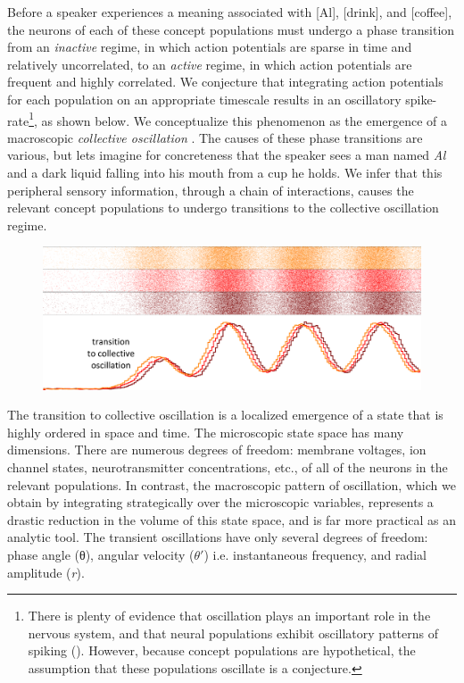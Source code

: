 Before a speaker experiences a meaning associated with [Al], [drink], and [coffee], the neurons of each of these concept populations must undergo a phase transition from an \textit{inactive} regime, in which action potentials are sparse in time and relatively uncorrelated, to an \textit{active} regime, in which action potentials are frequent and highly correlated. We conjecture that integrating action potentials for each population on an appropriate timescale results in an oscillatory spike-rate\footnote{There is plenty of evidence that oscillation plays an important role in the nervous system, and that neural populations exhibit oscillatory patterns of spiking (\citealt{AverbeckEtAl2003,Buzsaki2006,BuzsákiDraguhn2004,CanoltyKnight2010,EngelEtAl2001,Fuster2001,GerstnerKistler2002,Izhikevich2006,Izhikevich2007,IzhikevichEdelman2008,Klimesch1999}). However, because concept populations are hypothetical, the assumption that these populations oscillate is a conjecture.}, as shown below. We conceptualize this phenomenon as the emergence of a macroscopic \textit{collective oscillation} \citep{AcebrónEtAl2005,BreakspearEtAl2010,HongStrogatz2011,Kelso1997,SchonerKelso1988,Strogatz2000,Winfree2001}. The causes of these phase transitions are various, but lets imagine for concreteness that the speaker sees a man named \textit{Al} and a dark liquid falling into his mouth from a cup he holds. We infer that this peripheral sensory information, through a chain of interactions, causes the relevant concept populations to undergo transitions to the collective oscillation regime.


  
\begin{figure}
\includegraphics[width=\textwidth]{figures/Tilsen-img10.png}
\caption{\missingcaption}
\label{fig:2:3}
\end{figure}
 

  The transition to collective oscillation is a localized emergence of a state that is highly ordered in space and time. The microscopic state space has many dimensions. There are numerous degrees of freedom: membrane voltages, ion channel states, neurotransmitter concentrations, etc., of all of the neurons in the relevant populations. In contrast, the macroscopic pattern of oscillation, which we obtain by integrating strategically over the microscopic variables, represents a drastic reduction in the volume of this state space, and is far more practical as an analytic tool. The transient oscillations have only several degrees of freedom: phase angle (θ), angular velocity ($\theta ′$) i.e. instantaneous frequency, and radial amplitude (\textit{r}).


